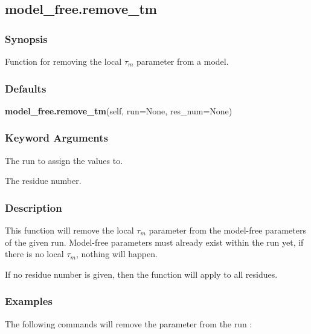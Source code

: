   

 \newpage 

 \subsection{model\_free.remove\_tm} 

  
 \subsubsection{Synopsis} 

 Function for removing the local $\tau_m$ parameter from a model. 
  

  
 \subsubsection{Defaults} 

 \textsf{\textbf{model\_free.remove\_tm}(self, run=None, res\_num=None)} 

  
 \subsubsection{Keyword Arguments} 

   The run to assign the values to.   

   The residue number.  

  

  
 \subsubsection{Description} 

 This function will remove the local $\tau_m$ parameter from the model-free parameters of the given run.  Model-free parameters must already exist within the run yet, if there is no local $\tau_m$, nothing will happen. 
  

 If no residue number is given, then the function will apply to all residues. 
  

  
 \subsubsection{Examples} 

 The following commands will remove the parameter  from the run : 
  


